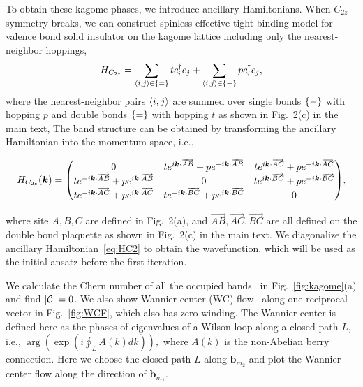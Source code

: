 \documentclass[aps,prl,floatfix,twocolumn]{revtex4-1}
\begin{document}
To obtain these kagome phases, we introduce ancillary Hamiltonians. When $ C_{2z} $ symmetry breaks, we can construct spinless effective tight-binding model for valence bond solid insulator on the kagome lattice including only the nearest-neighbor hoppings,
\begin{equation}
	H_{C_{2z}}=\sum_{\expval{i,j}\in\qty{=}}t c_i^\dagger c_j+\sum_{\expval{i,j}\in\qty{-}}p c_i^\dagger c_j,
\end{equation}
where the nearest-neighbor pairs  $ \expval{i,j} $ are summed over single bonds $ \qty{-} $ with hopping $ p $ and double bonds $ \qty{=} $ with hopping $ t $ as shown in Fig.~2(c) in the main text,  The band structure can be obtained by transforming the ancillary Hamiltonian into the momentum space, i.e.,
\begin{widetext}
	\begin{equation}\label{eq:HC2}
		H_{C_{2z}}(\bm{k})= \mqty(0 & t e^{i \bm{k}\cdot \overrightarrow{AB}}+p e^{-i \bm{k}\cdot \overrightarrow{AB}} & t e^{i \bm{k}\cdot \overrightarrow{AC}}+ p e^{-i \bm{k}\cdot \overrightarrow{AC}}\\
		t e^{-i \bm{k}\cdot \overrightarrow{AB}}+p e^{i \bm{k}\cdot \overrightarrow{AB}} & 0 & t e^{i \bm{k}\cdot \overrightarrow{BC}}+p e^{-i \bm{k}\cdot \overrightarrow{BC}}\\
		t e^{-i \bm{k}\cdot \overrightarrow{AC}}+ p e^{i \bm{k}\cdot \overrightarrow{AC}} & t e^{-i \bm{k}\cdot \overrightarrow{BC}}+p e^{i \bm{k}\cdot \overrightarrow{BC}} & 0),
	\end{equation}
\end{widetext}

where site $ A,B,C $ are defined in Fig.~2(a), and $ \overrightarrow{AB},\overrightarrow{AC},\overrightarrow{BC} $ are all defined on the double bond plaquette as shown in Fig.~2(c) in the main text. We diagonalize the ancillary Hamiltonian~\eqref{eq:HC2} to obtain the wavefunction, which will be used as the initial ansatz before the first iteration.

We calculate the Chern number of all the occupied bands~\cite{fukui2005chern} in Fig.~\ref{fig:kagome}(a) and find $ \abs{\mathcal{C}}=0 $. We also show Wannier center (WC) flow~\cite{yu2011equivalent} along one reciprocal vector in Fig.~\ref{fig:WCF}, which also has zero winding. The Wannier center is defined here as the phases of eigenvalues of a Wilson loop along a closed path $ L $, i.e., $ \arg(\exp(i{\oint_L A(k)dk})), $
where $ A(k) $ is the non-Abelian berry connection. Here we choose the closed path $ L $ along $ \bm{b}_{m_2} $ and plot the Wannier center flow along the direction of $ \bm{b}_{m_1} $.
\end{document}
